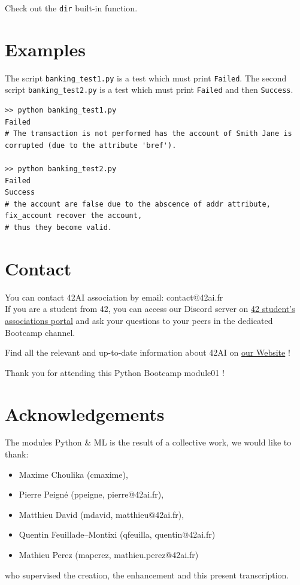 \documentclass{42-en}
\begin{document}
Check out the \texttt{dir} built-in function.


\section*{Examples}
The script \texttt{banking\_test1.py} is a test which must print \texttt{Failed}.
The second script \texttt{banking\_test2.py} is a test which must print \texttt{Failed} and then \texttt{Success}.

\begin{verbatim}
>> python banking_test1.py
Failed
# The transaction is not performed has the account of Smith Jane is corrupted (due to the attribute 'bref').

>> python banking_test2.py
Failed
Success
# the account are false due to the abscence of addr attribute, fix_account recover the account,
# thus they become valid.
\end{verbatim}



\newpage

\section*{Contact}
You can contact 42AI association by email: contact@42ai.fr\\

If you are a student from 42, you can access our Discord server 
on \href{https://discord.com/channels/887850395697807362/887850396314398720}{42 student's associations portal} and ask your
questions to your peers in the dedicated Bootcamp channel. 

Find all the relevant and up-to-date information about 42AI on \href{https://42-ai.github.io}{our Website} ! 

Thank you for attending this Python Bootcamp module01 !
\section*{Acknowledgements}
The modules Python \& ML is the result of a collective work, we would like to thank:
\begin{itemize}
  \item Maxime Choulika (cmaxime),
  \item Pierre Peigné (ppeigne, pierre@42ai.fr),
  \item Matthieu David (mdavid, matthieu@42ai.fr),
  \item Quentin Feuillade--Montixi (qfeuilla, quentin@42ai.fr)
  \item Mathieu Perez (maperez, mathieu.perez@42ai.fr)
\end{itemize}
who supervised the creation, the enhancement and this present transcription.
\end{document}
